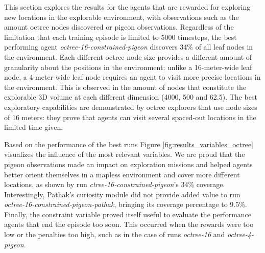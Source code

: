         This section explores the results for the agents that are rewarded for exploring new locations in the explorable environment, with observations such as the amount octree nodes discovered or pigeon observations. 
        Regardless of the limitation that each training episode is limited to 5000 timesteps, the best performing agent \textit{octree-16-constrained-pigeon} discovers 34\% of all leaf nodes in the environment.  
        Each different octree node size provides a different amount of granularity about the positions in the environment: unlike a 16-meter-wide leaf node, a 4-meter-wide leaf node requires an agent to visit more precise locations in the environment.
        This is observed in the amount of nodes that constitute the explorable 3D volume at each different dimension (4000, 500 and 62.5). 
        The best exploratory capabilities are demonstrated by octree explorers that use node sizes of 16 meters: they prove that agents can visit several spaced-out locations in the limited time given.
        

               
         Based on the performance of the best runs Figure \ref{fig:results_variables_octree} visualizes the influence of the most relevant variables.
        We are proud that the pigeon observations made an impact on exploration missions and helped agents better orient themselves in a mapless environment and cover more different locations, as shown by run \textit{ctree-16-constrained-pigeon}'s 34\% coverage.
        Interestingly, Pathak's curiosity module did not provide added value to run \textit{octree-16-constrained-pigeon-pathak}, bringing its coverage percentage to 9.5\%.
        Finally, the constraint variable proved itself useful to evaluate the performance agents that end the episode too soon. This occurred when the rewards were too low or the penalties too high, such as in the case of runs  \textit{octree-16} and \textit{octree-4-pigeon}. 

        
